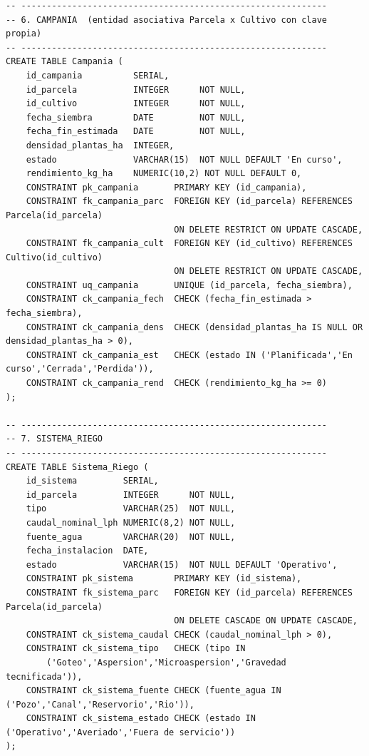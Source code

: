 \documentclass[11pt,letterpaper]{article}
\begin{document}
\begin{lstlisting}[style=sql, title={01\_ddl.sql}]
-- ------------------------------------------------------------
-- 6. CAMPANIA  (entidad asociativa Parcela x Cultivo con clave propia)
-- ------------------------------------------------------------
CREATE TABLE Campania (
    id_campania          SERIAL,
    id_parcela           INTEGER      NOT NULL,
    id_cultivo           INTEGER      NOT NULL,
    fecha_siembra        DATE         NOT NULL,
    fecha_fin_estimada   DATE         NOT NULL,
    densidad_plantas_ha  INTEGER,
    estado               VARCHAR(15)  NOT NULL DEFAULT 'En curso',
    rendimiento_kg_ha    NUMERIC(10,2) NOT NULL DEFAULT 0,
    CONSTRAINT pk_campania       PRIMARY KEY (id_campania),
    CONSTRAINT fk_campania_parc  FOREIGN KEY (id_parcela) REFERENCES Parcela(id_parcela)
                                 ON DELETE RESTRICT ON UPDATE CASCADE,
    CONSTRAINT fk_campania_cult  FOREIGN KEY (id_cultivo) REFERENCES Cultivo(id_cultivo)
                                 ON DELETE RESTRICT ON UPDATE CASCADE,
    CONSTRAINT uq_campania       UNIQUE (id_parcela, fecha_siembra),
    CONSTRAINT ck_campania_fech  CHECK (fecha_fin_estimada > fecha_siembra),
    CONSTRAINT ck_campania_dens  CHECK (densidad_plantas_ha IS NULL OR densidad_plantas_ha > 0),
    CONSTRAINT ck_campania_est   CHECK (estado IN ('Planificada','En curso','Cerrada','Perdida')),
    CONSTRAINT ck_campania_rend  CHECK (rendimiento_kg_ha >= 0)
);

-- ------------------------------------------------------------
-- 7. SISTEMA_RIEGO
-- ------------------------------------------------------------
CREATE TABLE Sistema_Riego (
    id_sistema         SERIAL,
    id_parcela         INTEGER      NOT NULL,
    tipo               VARCHAR(25)  NOT NULL,
    caudal_nominal_lph NUMERIC(8,2) NOT NULL,
    fuente_agua        VARCHAR(20)  NOT NULL,
    fecha_instalacion  DATE,
    estado             VARCHAR(15)  NOT NULL DEFAULT 'Operativo',
    CONSTRAINT pk_sistema        PRIMARY KEY (id_sistema),
    CONSTRAINT fk_sistema_parc   FOREIGN KEY (id_parcela) REFERENCES Parcela(id_parcela)
                                 ON DELETE CASCADE ON UPDATE CASCADE,
    CONSTRAINT ck_sistema_caudal CHECK (caudal_nominal_lph > 0),
    CONSTRAINT ck_sistema_tipo   CHECK (tipo IN
        ('Goteo','Aspersion','Microaspersion','Gravedad tecnificada')),
    CONSTRAINT ck_sistema_fuente CHECK (fuente_agua IN ('Pozo','Canal','Reservorio','Rio')),
    CONSTRAINT ck_sistema_estado CHECK (estado IN ('Operativo','Averiado','Fuera de servicio'))
);


\end{lstlisting}
\end{document}

